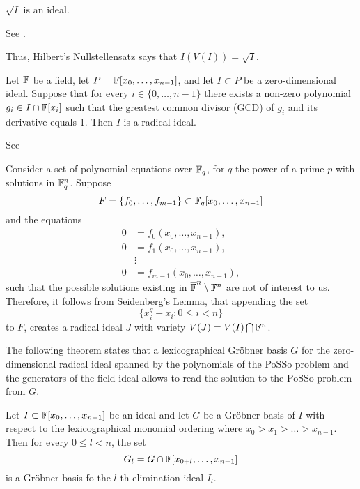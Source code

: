 \begin{lemma}
$\sqrt{I}$ is an ideal. 
\end{lemma}

\begin{citeproof}
See \cite[p.174]{Cox2005}.
\end{citeproof}

Thus, Hilbert's Nullstellensatz says that $I(V(I)) = \sqrt{I}$.

\begin{proposition}
Let $\mathbb{F}$ be a field, let $P = \mathbb{F}[x_0 ,\dots , x_{n-1}]$, and let $I \subset P$ be a zero-dimensional ideal. Suppose that for every $i \in \{0, \dots , n-1\}$  there exists a non-zero polynomial $g_i \in I \cap \mathbb{F}[x_i]$ such that the greatest common divisor (GCD) of $g_i$ and its derivative equals 1. Then $I$ is a radical ideal.
\end{proposition}

\begin{citeproof}
See \cite[p.250ff]{Kreuzer2000}
\end{citeproof}

Consider a set of polynomial equations over $\mathbb{F}_q$, for $q$ the power of a prime $p$ with solutions in $\mathbb{F}_q^n$. Suppose  $$F = \{f_0 , \dots , f_{m-1} \} \subset \mathbb{F}_q[x_0 ,\dots , x_{n-1}]$$ and the equations 
\begin{align*}
0 &= f_0 (x_0 , \dots , x_{n-1} ),\\
0 &= f_1 (x_0 , \dots , x_{n-1} ),\\
& \vdots\\
0 &= f_{m-1} (x_0 , \dots , x_{n-1} ),
\end{align*}
such that the possible solutions existing in $\overline{\mathbb{F}}^n \setminus \mathbb{F}^n$ are not of interest to us. Therefore, it follows from Seidenberg's Lemma, that appending the set
\[
  \{x_i^q − x_i : 0 ≤ i < n\}
\]
to $F$, creates a radical ideal $J$ with variety $V(J) =  V(I) \bigcap \mathbb{F}^n$.

The following theorem states that a lexicographical Gröbner basis $G$ for the zero-dimensional radical ideal spanned by the
polynomials of the PoSSo problem and the generators of the field ideal allows to read the solution to the PoSSo
problem from $G$. 

\begin{theorem}
Let $I \subset \mathbb{F}[x_0,\dots,x_{n-1}]$ be an ideal and let $G$ be a Gröbner basis of $I$ with respect to the lexicographical monomial ordering where $x_0 > x_1 > \dots > x_{n-1}$. Then for every $0 \leq l < n$, the set 
$$G_l = G \cap \mathbb{F}[x_{0+l},\dots,x_{n-1}]$$
is a Gröbner basis fo the $l$-th elimination ideal $I_l$. 
\end{theorem}

